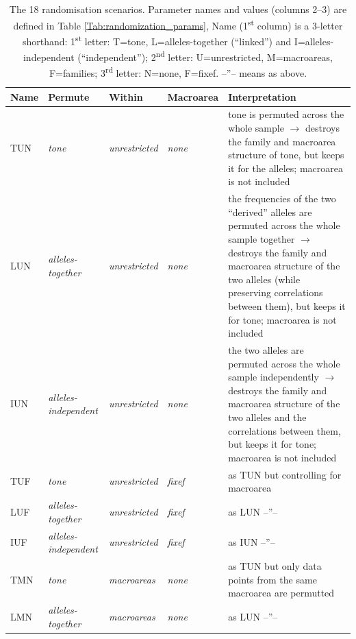 \documentclass[twoside,onecolumn]{article}
\begin{document}
\begin{table}[h]
  \caption{The 18 randomisation scenarios. Parameter names and values (columns 2--3) are defined in Table \ref{Tab:randomization_params}, Name (1\textsuperscript{st} column) is a 3-letter shorthand: 1\textsuperscript{st} letter: T=tone, L=alleles-together (``linked'') and I=alleles-independent (``independent''); 2\textsuperscript{nd} letter: U=unrestricted, M=macroareas, F=families; 3\textsuperscript{rd} letter: N=none, F=fixef. --''-- means as above.}
  \label{Tab:randomization_scenarios}
  \centering
  \begin{tabularx}{\textwidth}{|l|l|l|l|X|}
    \toprule
    \textbf{Name} & \textbf{Permute} & \textbf{Within} & \textbf{Macroarea} & \textbf{Interpretation} \\
    \midrule
    TUN & \textit{tone} & \textit{unrestricted} & \textit{none} & tone is permuted across the whole sample $\rightarrow$ destroys the family and macroarea structure of tone, but keeps it for the alleles; macroarea is not included \\
    \midrule
    LUN & \textit{alleles-together} & \textit{unrestricted} & \textit{none} & the frequencies of the two ``derived'' alleles are permuted across the whole sample together $\rightarrow$ destroys the family and macroarea structure of the two alleles (while preserving correlations between them), but keeps it for tone; macroarea is not included \\
    \midrule
    IUN & \textit{alleles-independent} & \textit{unrestricted} & \textit{none} & the two alleles are permuted across the whole sample independently $\rightarrow$ destroys the family and macroarea structure of the two alleles and the correlations between them, but keeps it for tone; macroarea is not included \\
    \midrule
    TUF & \textit{tone} & \textit{unrestricted} & \textit{fixef} & as TUN but controlling for macroarea \\
    LUF & \textit{alleles-together} & \textit{unrestricted} & \textit{fixef} & as LUN --''-- \\
    IUF & \textit{alleles-independent} & \textit{unrestricted} & \textit{fixef} & as IUN --''-- \\
    \midrule
    TMN & \textit{tone} & \textit{macroareas} & \textit{none} & as TUN but only data points from the same macroarea are permutted \\
    LMN & \textit{alleles-together} & \textit{macroareas} & \textit{none} & as LUN --''-- \\

\end{tabularx}
\end{table}
\end{document}
